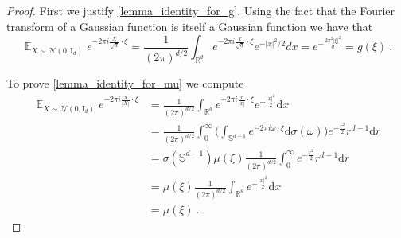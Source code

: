 \documentclass[10pt,a4paper]{amsart}
\newcommand{\dd}{{\mathrm d}}
\begin{document}
\begin{proof} 
First we justify \eqref{lemma_identity_for_g}. Using the fact that the Fourier transform of a Gaussian function is itself a Gaussian function we have that
$$\mathop{\mathbb{E}}_{X\sim \mathcal{N}(0,\textrm{I}_d)} e^{- 2\pi i \tfrac{X}{\sqrt{d}}\cdot \xi}= \frac{1}{(2\pi)^{d/2}} \int_{\mathbb{R}^d} e^{-2\pi i \tfrac{x}{\sqrt{d}}\cdot\xi}e^{-|x|^2/2}dx = e^{-\tfrac{2\pi^2|\xi|^2}{d}}= g(\xi)~.$$

To prove \eqref{lemma_identity_for_mu} we compute
\begin{align*} \mathop{\mathbb{E}}_{X\sim \mathcal{N}(0,\textrm{I}_d)} e^{-2\pi i \tfrac{X}{|X|}\cdot \xi} & = \frac{1}{(2\pi)^{d/2}}\int_{\mathbb{R}^d}  e^{-2\pi i \tfrac{x}{|x|}\cdot \xi} e^{-\tfrac{|x|^2}{2}}\dd x \\
& = \frac{1}{(2\pi)^{d/2}}\int_0^\infty \bigg( \int_{\mathbb{S}^{d-1}}  e^{-2\pi i\omega \cdot \xi} \dd\sigma(\omega)\bigg) e^{-\tfrac{r^2}{2}} r^{d-1}\dd r  \\
&= \sigma(\mathbb{S}^{d-1}) \mu(\xi) \frac{1}{(2\pi)^{d/2}}\int_0^\infty e^{-\tfrac{r^2}{2}} r^{d-1}\dd r \\
&= \mu(\xi) \frac{1}{(2\pi)^{d/2}}\int_{\mathbb{R}^d} e^{-\tfrac{|x|^2}{2}}\dd x \\
&= \mu(\xi)~.
\end{align*}
\end{proof}
\end{document}
